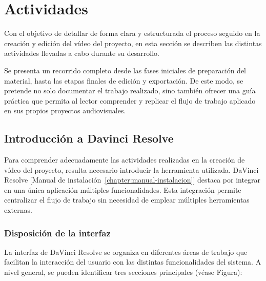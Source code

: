 \section{Actividades}

Con el objetivo de detallar de forma clara y estructurada el proceso seguido en la creación y 
edición del vídeo del proyecto, en esta sección se describen las distintas actividades llevadas 
a cabo durante su desarrollo.

Se presenta un recorrido completo desde las fases iniciales de preparación del material, 
hasta las etapas finales de edición y exportación. De este modo, se pretende no solo documentar el 
trabajo realizado, sino también ofrecer una guía práctica que permita al lector comprender y replicar 
el flujo de trabajo aplicado en sus propios proyectos audiovisuales.

\subsection{Introducción a Davinci Resolve}

Para comprender adecuadamente las actividades realizadas en la creación de vídeo del proyecto, resulta 
necesario introducir la herramienta utilizada. DaVinci Resolve [Manual de instalación~\ref{chapter:manual-instalacion}] destaca por integrar en una única 
aplicación múltiples funcionalidades. Esta integración permite centralizar el flujo de trabajo sin 
necesidad de emplear múltiples herramientas externas.

\subsubsection{Disposición de la interfaz}

La interfaz de DaVinci Resolve se organiza en diferentes áreas de trabajo que facilitan la interacción 
del usuario con las distintas funcionalidades del sistema. A nivel general, se pueden identificar 
tres secciones principales (véase Figura):


